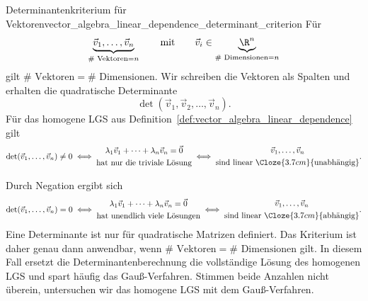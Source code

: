 \begin{KeyPointBox}{Determinantenkriterium für Vektoren}{vector_algebra_linear_dependence_determinant_criterion}
  Für
  \[
    \underbrace{\vec v_1,\dots,\vec v_n}_{\#\text{ Vektoren}=n}
    \qquad\text{mit}\qquad
    \vec v_i\in
    \underbrace{\R^n}_{\#\text{ Dimensionen}=n}
  \]
  gilt $\#\text{ Vektoren}=\#\text{ Dimensionen}$.
  Wir schreiben die Vektoren als Spalten und erhalten die quadratische
  Determinante
  \[
    \det(\vec v_1,\vec v_2,\dots,\vec v_n).
  \]
  Für das homogene LGS aus
  Definition~\ref{def:vector_algebra_linear_dependence} gilt
  \[
    \det(\vec v_1,\dots,\vec v_n)\ne0
    \;\Longleftrightarrow\;
    \begin{gathered}
      \lambda_1\vec v_1+\dots+\lambda_n\vec v_n=\vec 0\\
      \text{hat nur die triviale Lösung}
    \end{gathered}
    \;\Longleftrightarrow\;
    \begin{gathered}
      \vec v_1,\dots,\vec v_n\\
      \text{sind linear }\Cloze{3.7cm}{\text{unabhängig}}
    \end{gathered}.
  \]

  Durch Negation ergibt sich
  \[
    \det(\vec v_1,\dots,\vec v_n)=0
    \;\Longleftrightarrow\;
    \begin{gathered}
      \lambda_1\vec v_1+\dots+\lambda_n\vec v_n=\vec 0\\
      \text{hat unendlich viele Lösungen}
    \end{gathered}
    \;\Longleftrightarrow\;
    \begin{gathered}
      \vec v_1,\dots,\vec v_n\\
      \text{sind linear }\Cloze{3.7cm}{\text{abhängig}}
    \end{gathered}.
  \]
  Eine Determinante ist nur für quadratische Matrizen definiert. Das Kriterium
  ist daher genau dann anwendbar, wenn
  $\#\text{ Vektoren}=\#\text{ Dimensionen}$ gilt. In diesem Fall ersetzt die
  Determinantenberechnung die vollständige Lösung des homogenen LGS und spart
  häufig das Gauß-Verfahren. Stimmen beide Anzahlen nicht überein, untersuchen
  wir das homogene LGS mit dem Gauß-Verfahren.
\end{KeyPointBox}

